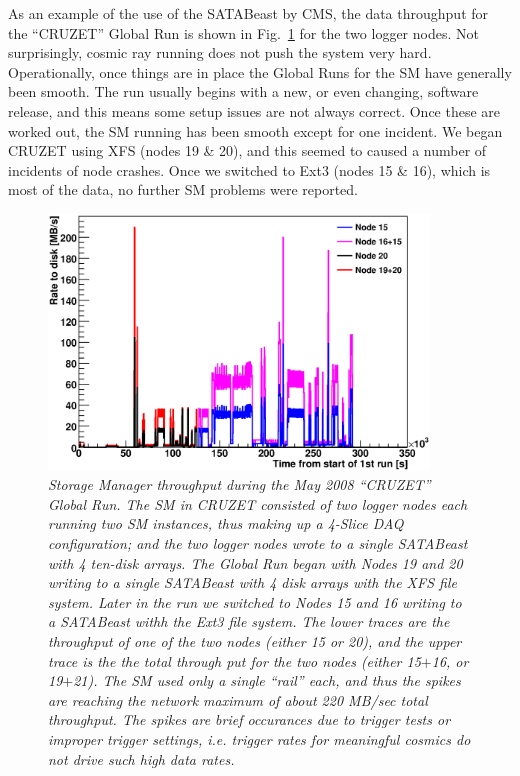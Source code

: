 As an example of the use of the SATABeast by CMS,
the data throughput for the ``CRUZET'' Global Run is shown in Fig.~\ref{fig:cruzet}
for the two logger nodes.
Not surprisingly, cosmic ray running does not push the system very hard.
Operationally, once things are in place the Global Runs for the SM have
generally been smooth.
The run usually begins with a new, or even changing, software release,
and this means some setup issues are not always correct.
Once these are worked out, the SM running has been smooth except for one incident.
We began CRUZET using XFS (nodes 19 \& 20), and this seemed to caused a number
of incidents of node crashes.
Once we switched to Ext3 (nodes 15 \& 16), which is most of the data, 
no further SM problems were reported.

\begin{figure}[t]
\begin{center}  
\includegraphics[width=0.9\textwidth]{Hardware/cruzetByNode}
\caption{\emph{Storage Manager throughput during the May 2008 ``CRUZET'' Global Run. 
The SM in CRUZET consisted of two logger nodes each running two SM instances,
thus making up a 4-Slice DAQ configuration; and the two logger nodes wrote
to a single SATABeast with 4 ten-disk arrays.
 The Global Run began with Nodes 19 and 20
writing to a single SATABeast with 4 disk arrays with the XFS file system.
Later in the run we switched to Nodes 15 and 16 writing to a SATABeast withh the Ext3
file system.
The lower traces are the throughput of one of the two nodes
(either 15 or 20), and the upper trace is the the total through put for
the two nodes (either 15$+$16, or 19$+$21). 
The SM used only a single ``rail'' each, and thus the spikes are reaching the network 
maximum of about 220 MB/sec total throughput. The spikes are brief occurances
due to trigger tests or improper trigger settings, 
i.e.  trigger rates for meaningful cosmics do not drive such high data rates.}}
\label{fig:cruzet}
\end{center}
\end{figure}  

